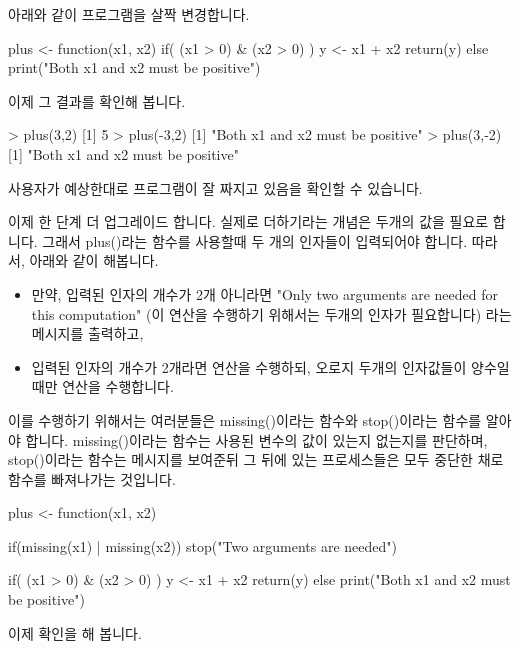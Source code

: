\documentclass{book}
\begin{document}
아래와 같이 프로그램을 살짝 변경합니다. 

\begin{Schunk}
\begin{Soutput}
plus <- function(x1, x2){
	if( (x1 > 0) & (x2 > 0) ){
		y <- x1 + x2
		return(y)
	}
	else print("Both x1 and x2 must be positive")
}
\end{Soutput}
\end{Schunk}

이제 그 결과를 확인해 봅니다. 

\begin{Schunk}
\begin{Soutput}
> plus(3,2)
[1] 5
> plus(-3,2)
[1] "Both x1 and x2 must be positive"
> plus(3,-2)
[1] "Both x1 and x2 must be positive"
\end{Soutput}
\end{Schunk}

사용자가 예상한대로 프로그램이 잘 짜지고 있음을 확인할 수 있습니다. 

이제 한 단계 더 업그레이드 합니다. 
실제로 더하기라는 개념은 두개의 값을 필요로 합니다. 
그래서 plus()라는 함수를 사용할때 두 개의 인자들이 입력되어야 합니다.
따라서, 아래와 같이 해봅니다.

\begin{itemize}
\item 만약, 입력된 인자의 개수가 2개 아니라면 "Only two arguments are needed for this computation" (이 연산을 수행하기 위해서는 두개의 인자가 필요합니다) 라는 메시지를 출력하고, 
\item 입력된 인자의 개수가 2개라면 연산을 수행하되, 오로지 두개의 인자값들이 양수일때만 연산을 수행합니다. 
\end{itemize}

이를 수행하기 위해서는 여러분들은 missing()이라는 함수와 stop()이라는 함수를 알아야 합니다. 
missing()이라는 함수는 사용된 변수의 값이 있는지 없는지를 판단하며, stop()이라는 함수는 메시지를 보여준뒤 그 뒤에 있는 프로세스들은 모두 중단한 채로 함수를 빠져나가는 것입니다. 

\begin{Schunk}
\begin{Soutput}
plus <- function(x1, x2){
	if(missing(x1) | missing(x2)) stop("Two arguments are needed")
	
	if( (x1 > 0) & (x2 > 0) ){
		y <- x1 + x2
		return(y)
	}
	else print("Both x1 and x2 must be positive")
}
\end{Soutput}
\end{Schunk}

이제 확인을 해 봅니다. 
\end{document}
